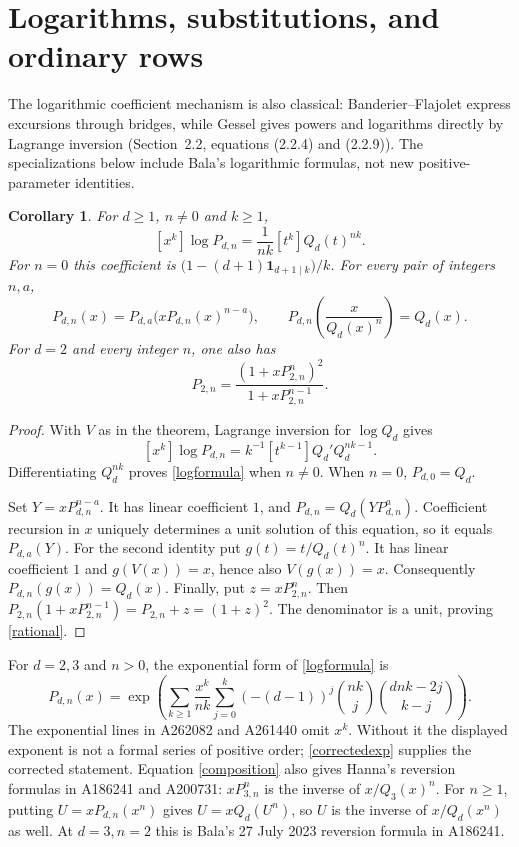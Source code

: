 \documentclass[11pt]{article}
\newtheorem{corollary}[theorem]{Corollary}
\newcommand{\coef}[2]{[#1^{#2}]}
\begin{document}
\section{Logarithms, substitutions, and ordinary rows}
The logarithmic coefficient mechanism is also classical:
Banderier--Flajolet \cite[Corollary 2]{banderier} express
excursions through bridges, while Gessel \cite{gessel} gives powers
and logarithms directly by Lagrange inversion (Section~2.2,
equations (2.2.4) and (2.2.9)). The specializations below include
Bala's logarithmic formulas, not new positive-parameter identities.
\begin{corollary}\label{logarithm}
For $d\geq1$, $n\ne0$ and $k\geq1$,
\begin{equation}\label{logformula}
 \coef{x}{k}\log P_{d,n}=\frac1{nk}\coef{t}{k}Q_d(t)^{nk}.
\end{equation}
For $n=0$ this coefficient is
$\bigl(1-(d+1)\mathbf1_{d+1\mid k}\bigr)/k$.
For every pair of integers $n,a$,
\begin{equation}\label{composition}
 P_{d,n}(x)=P_{d,a}\bigl(xP_{d,n}(x)^{n-a}\bigr),\qquad
 P_{d,n}\left(\frac{x}{Q_d(x)^n}\right)=Q_d(x).
\end{equation}
For $d=2$ and every integer $n$, one also has
\begin{equation}\label{rational}
 P_{2,n}=\frac{(1+xP_{2,n}^n)^2}{1+xP_{2,n}^{n-1}}.
\end{equation}
\end{corollary}
\begin{proof}
With $V$ as in the theorem, Lagrange inversion for $\log Q_d$ gives
\[
\coef{x}{k}\log P_{d,n}=k^{-1}\coef{t}{k-1}Q_d'Q_d^{nk-1}.
\]
Differentiating $Q_d^{nk}$ proves \eqref{logformula} when $n\ne0$.
When $n=0$, $P_{d,0}=Q_d$.

Set $Y=xP_{d,n}^{n-a}$. It has linear coefficient $1$, and
$P_{d,n}=Q_d(YP_{d,n}^a)$. Coefficient recursion in $x$ uniquely
determines a unit solution of this equation, so it equals $P_{d,a}(Y)$.
For the second identity put $g(t)=t/Q_d(t)^n$. It has linear coefficient
$1$ and $g(V(x))=x$, hence also $V(g(x))=x$.
Consequently $P_{d,n}(g(x))=Q_d(x)$.
Finally, put $z=xP_{2,n}^n$. Then
$P_{2,n}(1+xP_{2,n}^{n-1})=P_{2,n}+z=(1+z)^2$.
The denominator is a unit, proving \eqref{rational}.
\end{proof}

For $d=2,3$ and $n>0$, the exponential form of \eqref{logformula} is
\begin{equation}\label{correctedexp}
 P_{d,n}(x)=\exp\left(\sum_{k\geq1}\frac{x^k}{nk}
 \sum_{j=0}^k (-(d-1))^j\binom{nk}{j}\binom{dnk-2j}{k-j}\right).
\end{equation}
The exponential lines in A262082 and A261440 omit $x^k$.
Without it the displayed exponent is not a formal series of positive
order; \eqref{correctedexp} supplies the corrected statement.
Equation \eqref{composition} also gives Hanna's reversion formulas in
A186241 and A200731: $xP_{3,n}^n$ is the inverse of $x/Q_3(x)^n$.
For $n\geq1$, putting $U=xP_{d,n}(x^n)$ gives
$U=xQ_d(U^n)$, so $U$ is the inverse of $x/Q_d(x^n)$ as well.
At $d=3,n=2$ this is Bala's 27 July 2023 reversion formula in A186241.
\end{document}

